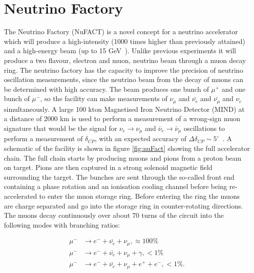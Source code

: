 \section{Neutrino Factory}\label{subsec:nuFACT}
The Neutrino Factory (NuFACT) is a novel concept for a neutrino accelerator which will produce a high-intensity (1000 times higher than previously attained) and a high-energy beam (up to 15 GeV~\cite{Fix7}). Unlike previous experiments it will produce a two flavour, electron and muon, neutrino beam through a muon decay ring. The neutrino factory has the capacity to improve the precision of neutrino oscillation measurements, since the neutrino beam from the decay of muons can be determined with high accuracy. The beam produces one bunch of $\mu^+$ and one bunch of $\mu^-$, so the facility can make measurements of $\nu_{\mu}$ and $\bar{\nu_{e}}$ and $\bar{\nu_{\mu}}$ and $\nu_{e}$ simultaneously. A large 100 kton Magnetised Iron Neutrino Detector (MIND) at a distance of 2000 km is used to perform a measurement of a wrong-sign muon signature that would be the signal for $\nu_e \rightarrow \nu_\mu$ and $\bar{\nu}_e \rightarrow \bar{\nu}_\mu$ oscillations to perform a measurement of $\delta_{CP}$, with an expected accuracy of $\Delta \delta_{CP}\sim 5^\circ$~\cite{25NUfact}. A schematic of the facility is shown in figure \ref{fig:nuFact} showing the full accelerator chain. The full chain starts by producing muons and pions from a proton beam on target. Pions are then captured in a strong solenoid magnetic field surrounding the target. The bunches are sent through the so-called front end containing a phase rotation and an ionisation cooling channel before being re-accelerated to enter the muon storage ring. Before entering the ring the muons are charge separated and go into the storage ring in counter-rotating directions. The muons decay continuously over about 70 turns of the circuit into the following modes with branching ratios:


\begin{align}
\mu^- &\rightarrow e^- + \bar{\nu_e} + \nu_\mu, \approx 100\% \\
\mu^- &\rightarrow e^- + \bar{\nu_e} + \nu_\mu + \gamma, <1\% \\
\mu^- &\rightarrow e^- + \bar{\nu_e} + \nu_\mu + e^+ + e^-, <1\% .
\end{align}

